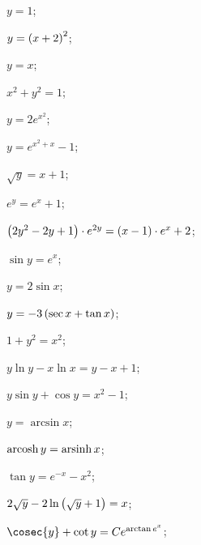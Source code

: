 \begin{enumsols}
		\label{sol:firstorder:separable_cauchy}
		\item \( y = 1 \); \sfill %
		\item \( y = \left( x + 2 \right)^2 \); \sfill %
		\item \( y = x \); \sfill %
		\item \( x^2 + y^2 = 1 \); \sfill %
		\item \( y = 2e^{x^2} \); \sfill %
		\item \( y = e^{x^2 + x} - 1 \); \sfill %
		\item \( \sqrt{y} = x + 1 \); \sfill %
		\item \( e^{y} = e^{x} + 1 \); \sfill %
		\item \( \left( 2y^2 - 2y + 1 \right) \cdot e^{2y} = \left( x - 1 \right) \cdot e^{x} + 2 \); \sfill %
		\item \( \sin{y} = e^{x} \); \sfill %
		\item \( y = 2\sin{x} \); \sfill %
		\item \( y = -3 \left( \sec{x} + \tan{x} \right) \); \sfill %
		\item \( 1 + y^2 = x^2 \); \sfill %
		\item \( y \ln{y} - x \ln{x} = y - x + 1 \); \sfill %
		\item \( y \sin{y} + \cos{y} = x^2 - 1 \); \sfill %
		\item \( y = \arcsin{x} \); \sfill %
		\item \( \operatorname{arcosh}{y} = \operatorname{arsinh}{x} \); \sfill %
		\item \( \tan{y} = e^{-x} - x^2 \); \sfill %
		\item \( 2\sqrt{y} - 2 \ln\left( \sqrt{y} + 1 \right) = x \); \sfill %
		\item \( \cosec{y} + \cot{y} = Ce^{\arctan{e^x}} \); \sfill %
	
	\end{enumsols}

